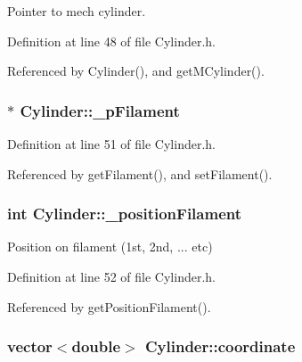 Pointer to mech cylinder. 



Definition at line 48 of file Cylinder.\+h.



Referenced by Cylinder(), and get\+M\+Cylinder().

\hypertarget{classCylinder_a0229e3f223dc18ef21fef8db0f2f4b51}{
\subsubsection[{\+\_\+p\+Filament}]{$\ast$ Cylinder\+::\+\_\+p\+Filament\hspace{0.3cm}{\ttfamily [private]}}}\label{classCylinder_a0229e3f223dc18ef21fef8db0f2f4b51}


Definition at line 51 of file Cylinder.\+h.



Referenced by get\+Filament(), and set\+Filament().

\hypertarget{classCylinder_a372ecc7b3dc54ca5dd042b043af437d6}{
\subsubsection[{\+\_\+position\+Filament}]{\setlength{\rightskip}{0pt plus 5cm}int Cylinder\+::\+\_\+position\+Filament\hspace{0.3cm}{\ttfamily [private]}}}\label{classCylinder_a372ecc7b3dc54ca5dd042b043af437d6}


Position on filament (1st, 2nd, ... etc) 



Definition at line 52 of file Cylinder.\+h.



Referenced by get\+Position\+Filament().

\hypertarget{classCylinder_a8c7a6cfe1aecf1ee0eff3aaf9c11338f}{
\subsubsection[{coordinate}]{\setlength{\rightskip}{0pt plus 5cm}vector$<$double$>$ Cylinder\+::coordinate}}\label{classCylinder_a8c7a6cfe1aecf1ee0eff3aaf9c11338f}


